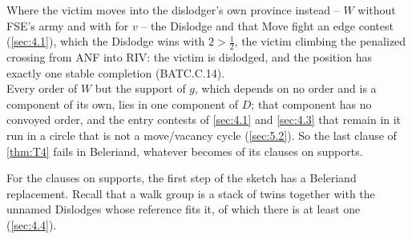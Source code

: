 \documentclass[12pt,a4paper]{article}
\begin{document}
Where the victim moves into the dislodger's own province instead -- $W$ without FSE's army and with  for $v$ -- the Dislodge and that Move fight an edge contest (\cref{sec:4.1}), which the Dislodge wins with $2 > \tfrac{1}{2}$, the victim climbing the penalized crossing from ANF into RIV: the victim is dislodged, and the position has exactly one stable completion (BATC.C.14).\\
Every order of $W$ but the support of $g$, which depends on no order and is a component of its own, lies in one component of $D$; that component has no convoyed order, and the entry contests of \cref{sec:4.1} and \cref{sec:4.3} that remain in it run in a circle that is not a move/vacancy cycle (\cref{sec:5.2}).
So the last clause of \cref{thm:T4} fails in Beleriand, whatever becomes of its clauses on supports.

For the clauses on supports, the first step of the sketch has a Beleriand replacement.
Recall that a walk group is a stack of twins together with the unnamed Dislodges whose reference fits it, of which there is at least one (\cref{sec:4.4}).
\end{document}
